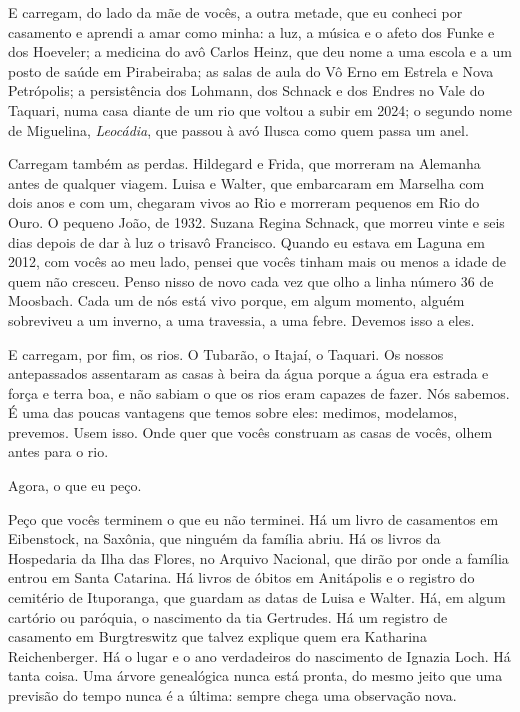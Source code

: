 \documentclass[
  brazilian,
  11pt,
  openany]{book}
\begin{document}
E carregam, do lado da mãe de vocês, a outra metade, que eu conheci por
casamento e aprendi a amar como minha: a luz, a música e o afeto dos
Funke e dos Hoeveler; a medicina do avô Carlos Heinz, que deu nome a uma
escola e a um posto de saúde em Pirabeiraba; as salas de aula do Vô Erno
em Estrela e Nova Petrópolis; a persistência dos Lohmann, dos Schnack e
dos Endres no Vale do Taquari, numa casa diante de um rio que voltou a
subir em 2024; o segundo nome de Miguelina, \emph{Leocádia}, que passou
à avó Ilusca como quem passa um anel.

Carregam também as perdas. Hildegard e Frida, que morreram na Alemanha
antes de qualquer viagem. Luisa e Walter, que embarcaram em Marselha com
dois anos e com um, chegaram vivos ao Rio e morreram pequenos em Rio do
Ouro. O pequeno João, de 1932. Suzana Regina Schnack, que morreu vinte e
seis dias depois de dar à luz o trisavô Francisco. Quando eu estava em
Laguna em 2012, com vocês ao meu lado, pensei que vocês tinham mais ou
menos a idade de quem não cresceu. Penso nisso de novo cada vez que olho
a linha número 36 de Moosbach. Cada um de nós está vivo porque, em algum
momento, alguém sobreviveu a um inverno, a uma travessia, a uma febre.
Devemos isso a eles.

E carregam, por fim, os rios. O Tubarão, o Itajaí, o Taquari. Os nossos
antepassados assentaram as casas à beira da água porque a água era
estrada e força e terra boa, e não sabiam o que os rios eram capazes de
fazer. Nós sabemos. É uma das poucas vantagens que temos sobre eles:
medimos, modelamos, prevemos. Usem isso. Onde quer que vocês construam
as casas de vocês, olhem antes para o rio.

Agora, o que eu peço.

Peço que vocês terminem o que eu não terminei. Há um livro de casamentos
em Eibenstock, na Saxônia, que ninguém da família abriu. Há os livros da
Hospedaria da Ilha das Flores, no Arquivo Nacional, que dirão por onde a
família entrou em Santa Catarina. Há livros de óbitos em Anitápolis e o
registro do cemitério de Ituporanga, que guardam as datas de Luisa e
Walter. Há, em algum cartório ou paróquia, o nascimento da tia
Gertrudes. Há um registro de casamento em Burgtreswitz que talvez
explique quem era Katharina Reichenberger. Há o lugar e o ano
verdadeiros do nascimento de Ignazia Loch. Há tanta coisa. Uma árvore
genealógica nunca está pronta, do mesmo jeito que uma previsão do tempo
nunca é a última: sempre chega uma observação nova.
\end{document}
